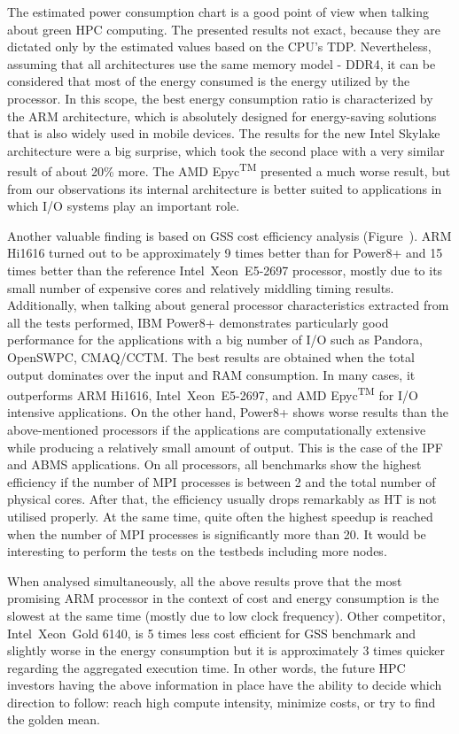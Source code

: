 The estimated power consumption chart is a good point of view when talking about green HPC computing. The presented results not exact, because they are dictated only by the estimated values based on the CPU's TDP. Nevertheless, assuming that all architectures use the same memory model - DDR4, it can be considered that most of the energy consumed is the energy utilized by the processor. In this scope, the best energy consumption ratio is characterized by the ARM architecture, which is absolutely designed for energy-saving solutions that is also widely used in mobile devices. The results for the new Intel Skylake architecture were a big surprise, which took the second place with a very similar result of about 20\% more. The AMD Epyc\textsuperscript{TM} presented a much worse result, but from our observations its internal architecture is better suited to applications in which I/O systems play an important role.

Another valuable finding is based on GSS cost efficiency analysis (Figure~). ARM Hi1616 turned out to be approximately 9 times better than for Power8+ and 15 times better than the reference Intel\textregistered\ Xeon\textregistered\ E5-2697 processor, mostly due to its small number of expensive cores and relatively middling timing results.
Additionally, when talking about general processor characteristics extracted from all the tests performed, IBM Power8+ demonstrates particularly good performance for the applications with a big number of I/O such as Pandora, OpenSWPC, CMAQ/CCTM. The best results are obtained when the total output dominates over the input and RAM consumption. In many cases, it outperforms ARM Hi1616, Intel\textregistered\ Xeon\textregistered\ E5-2697, and AMD Epyc\textsuperscript{TM} for I/O intensive applications. On the other hand, Power8+ shows worse results than the above-mentioned processors if the applications are computationally extensive while producing a relatively small amount of output. This is the case of the IPF and ABMS applications. On all processors, all benchmarks show the highest efficiency if the number of MPI processes is between 2 and the total number of physical cores. After that, the efficiency usually drops remarkably as HT is not utilised properly. At the same time, quite often the highest speedup is reached when the number of MPI processes is significantly more than 20. It would be interesting to perform the tests on the testbeds including more nodes. 



When analysed simultaneously, all the above results prove that the most promising ARM processor in the context of cost and energy consumption is the slowest at the same time (mostly due to low clock frequency). Other competitor, Intel\textregistered\ Xeon\textregistered\ Gold 6140, is 5 times less cost efficient for GSS benchmark and slightly worse in the energy consumption but it is approximately 3 times quicker regarding the aggregated execution time. In other words, the future HPC investors having the above information in place have the ability to decide which direction to follow: reach high compute intensity, minimize costs, or try to find the golden mean.

